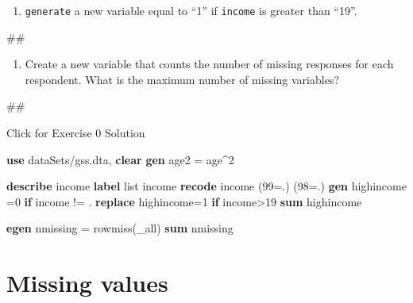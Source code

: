 \documentclass[
]{book}
\newenvironment{Shaded}{\begin{snugshade}}{\end{snugshade}}
\newcommand{\DataTypeTok}[1]{\textcolor[rgb]{0.13,0.29,0.53}{#1}}
\newcommand{\FunctionTok}[1]{\textcolor[rgb]{0.00,0.00,0.00}{#1}}
\newcommand{\KeywordTok}[1]{\textcolor[rgb]{0.13,0.29,0.53}{\textbf{#1}}}
\newcommand{\NormalTok}[1]{#1}
\newcommand{\OtherTok}[1]{\textcolor[rgb]{0.56,0.35,0.01}{#1}}
\providecommand{\tightlist}{%
  \setlength{\itemsep}{0pt}\setlength{\parskip}{0pt}}
\begin{document}
\begin{enumerate}
\def\labelenumi{\arabic{enumi}.}
\setcounter{enumi}{1}
\tightlist
\item
  \texttt{generate} a new variable equal to ``1'' if \texttt{income} is greater than ``19''.
\end{enumerate}

\begin{Shaded}
\begin{Highlighting}[]
\NormalTok{\#\#}
\end{Highlighting}
\end{Shaded}

\begin{enumerate}
\def\labelenumi{\arabic{enumi}.}
\setcounter{enumi}{2}
\tightlist
\item
  Create a new variable that counts the number of missing responses for each respondent. What is the maximum number of missing variables?
\end{enumerate}

\begin{Shaded}
\begin{Highlighting}[]
\NormalTok{\#\#}
\end{Highlighting}
\end{Shaded}

{Click for Exercise 0 Solution}

\begin{alert}

\begin{Shaded}
\begin{Highlighting}[]
\KeywordTok{use}\NormalTok{ dataSets/gss.dta, }\KeywordTok{clear}
\KeywordTok{gen}\NormalTok{ age2 = age\^{}2}

\KeywordTok{describe}\NormalTok{ income}
\KeywordTok{label} \OtherTok{list}\NormalTok{ income}
\KeywordTok{recode}\NormalTok{ income (99=.) (98=.)}
\KeywordTok{gen}\NormalTok{ highincome =0 }\KeywordTok{if}\NormalTok{ income != .}
\KeywordTok{replace}\NormalTok{ highincome=1 }\KeywordTok{if}\NormalTok{ income\textgreater{}19}
\KeywordTok{sum}\NormalTok{ highincome}

\KeywordTok{egen}\NormalTok{ nmissing = }\FunctionTok{rowmiss}\NormalTok{(}\DataTypeTok{\_all}\NormalTok{)}
\KeywordTok{sum}\NormalTok{ nmissing}
\end{Highlighting}
\end{Shaded}

\end{alert}

\hypertarget{missing-values}{%
\section{Missing values}\label{missing-values}}
\end{document}
